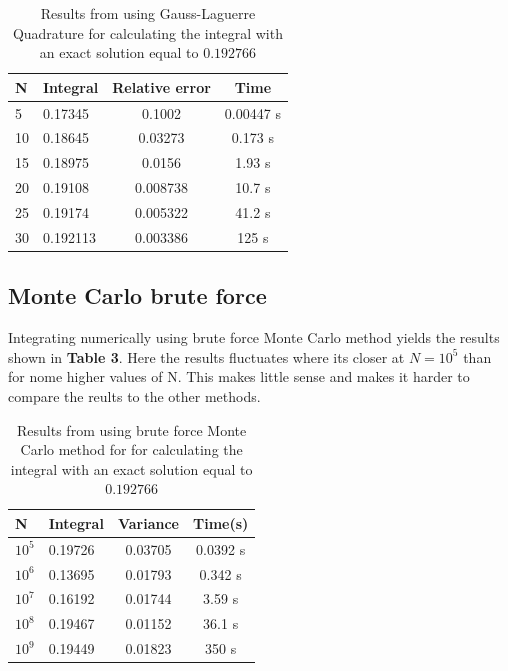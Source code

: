 \documentclass[twoside,twocolumn]{article}
\begin{document}
\begin{table}[h]
\centering
\begin{tabular}{|l|l|c|c|}
\hline
N  & Integral & \multicolumn{1}{l|}{Relative error} & Time      \\ \hline
5  & 0.17345  & 0.1002                              & 0.00447 s \\ \hline
10 & 0.18645  & 0.03273                             & 0.173 s   \\ \hline
15 & 0.18975  & 0.0156                              & 1.93 s    \\ \hline
20 & 0.19108  & 0.008738                            & 10.7 s    \\ \hline
25 & 0.19174  & 0.005322                            & 41.2 s    \\ \hline
30 & 0.192113 & 0.003386                            & 125 s     \\ \hline
\end{tabular}
\caption{Results from using Gauss-Laguerre Quadrature for calculating the integral with an exact solution equal to $0.192766$}
\end{table}
\subsection{Monte Carlo brute force}
Integrating numerically using brute force Monte Carlo method yields the results shown in \textbf{Table 3}. Here the results fluctuates where its closer at $N = 10^5$ than for nome higher values of N. This makes little sense and makes it harder to compare the reults to the other methods. 
\begin{table}[h]
\centering
\begin{tabular}{|l|l|c|c|}
\hline
N                     & Integral & \multicolumn{1}{l|}{Variance} & Time(s)  \\ \hline
$10^5$ & 0.19726  & 0.03705                       & 0.0392 s \\ \hline
$10^6$ & 0.13695  & 0.01793                       & 0.342 s  \\ \hline
$10^7$ & 0.16192  & 0.01744                       & 3.59 s   \\ \hline
$10^8$ &0.19467  & 0.01152                       & 36.1 s   \\ \hline
$10^9$ & 0.19449  & 0.01823                       & 350 s    \\ \hline
\end{tabular}
\caption{Results from using brute force Monte Carlo method for for calculating the integral with an exact solution equal to $0.192766$}
\end{table}
\end{document}
